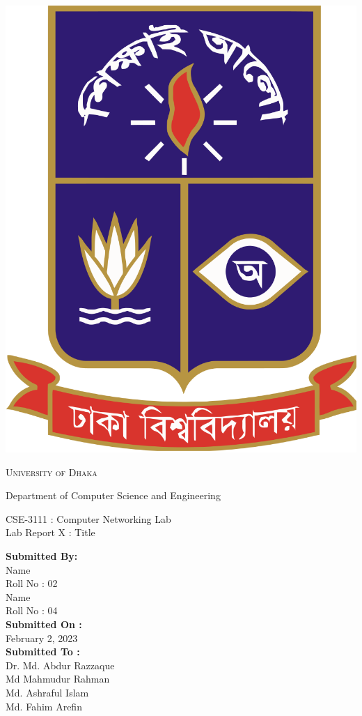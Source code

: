 \documentclass[11pt]{article}
\begin{document}
\begin{titlepage}
	\begin{center}
    	\includegraphics[scale=0.10]{du.png}\par
		\begin{Huge}
			\textsc{University of Dhaka}\par
		\end{Huge}
		\begin{Large}
			Department of Computer Science and Engineering\par \vspace{1cm}
			CSE-3111 : Computer Networking Lab \\[12pt]	
			Lab Report X : Title
		\end{Large}
	\end{center}  	
	\begin{large}
		\textbf{Submitted By:\\[12pt]}
			Name\\[8pt]
			Roll No : 02\\[12pt]
			Name\\[8pt]
			Roll No : 04\\[12pt]
		\textbf{Submitted On : \\[12pt]}
			February 2, 2023\\[20pt]
		\textbf{Submitted To :\\[12pt]}
			Dr. Md. Abdur Razzaque\\[12pt]
                Md Mahmudur Rahman\\[12pt]
                Md. Ashraful Islam\\[12pt]
                Md. Fahim Arefin
	\end{large}
\end{titlepage}
\end{document}
